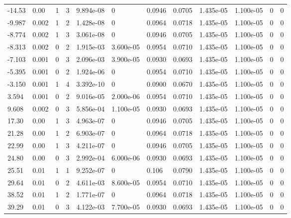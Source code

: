 \documentclass[preview]{standalone}
\begin{document}
{{\begin{tabular}{L{1.2cm}C{1.2cm} C{0.3cm}C{0.5cm} C{1.4cm}C{1.4cm} C{1.4cm}C{1.4cm} C{1.6cm}C{1.6cm} C{1.6cm}C{1.6cm}}
  -14.53  &  0.00  & 1     &  3 &  9.894e-08  & 0  &  0.0946&   0.0705& 1.435e-05 & 1.100e-05   &  0 & 0  \\ 
  -9.987  &  0.002  & 1     &  2 &  1.428e-08  & 0  &  0.0964&   0.0718& 1.435e-05 & 1.100e-05   &  0 & 0  \\ 
  -8.774  &  0.002  & 1     &  3 &  3.061e-08  & 0  &  0.0946&   0.0705& 1.435e-05 & 1.100e-05   &  0 & 0  \\ 
  -8.313  &  0.002  & 0     &  2 &  1.915e-03  & 3.600e-05  &  0.0954&   0.0710& 1.435e-05 & 1.100e-05   &  0 & 0  \\ 
  -7.103  &  0.001  & 0     &  3 &  2.096e-03  & 3.900e-05  &  0.0930&   0.0693& 1.435e-05 & 1.100e-05   &  0 & 0  \\ 
  -5.395  &  0.001  & 0     &  2 &  1.924e-06  & 0  &  0.0954&   0.0710& 1.435e-05 & 1.100e-05   &  0 & 0  \\ 
  -3.150  &  0.001  & 1     &  4 &  3.392e-10  & 0  &  0.0900&   0.0670& 1.435e-05 & 1.100e-05   &  0 & 0  \\ 
  3.594  &  0.001  & 0     &  2 &  9.016e-05  & 2.000e-06  &  0.0954&   0.0710& 1.435e-05 & 1.100e-05   &  0 & 0  \\ 
  9.608  &  0.002  & 0     &  3 &  5.856e-04  & 1.100e-05  &  0.0930&   0.0693& 1.435e-05 & 1.100e-05   &  0 & 0  \\ 
  17.30  &  0.00  & 1     &  3 &  4.963e-07  & 0  &  0.0946&   0.0705& 1.435e-05 & 1.100e-05   &  0 & 0  \\ 
  21.28  &  0.00  & 1     &  2 &  6.903e-07  & 0  &  0.0964&   0.0718& 1.435e-05 & 1.100e-05   &  0 & 0  \\ 
  22.99  &  0.00  & 1     &  3 &  4.211e-07  & 0  &  0.0946&   0.0705& 1.435e-05 & 1.100e-05   &  0 & 0  \\ 
  24.80  &  0.00  & 0     &  3 &  2.992e-04  & 6.000e-06  &  0.0930&   0.0693& 1.435e-05 & 1.100e-05   &  0 & 0  \\ 
  25.51  &  0.01  & 1     &  1 &  9.252e-07  & 0  &  0.106&   0.0790& 1.435e-05 & 1.100e-05   &  0 & 0  \\ 
  29.64  &  0.01  & 0     &  2 &  4.611e-03  & 8.600e-05  &  0.0954&   0.0710& 1.435e-05 & 1.100e-05   &  0 & 0  \\ 
  38.52  &  0.01  & 1     &  2 &  1.771e-07  & 0  &  0.0964&   0.0718& 1.435e-05 & 1.100e-05   &  0 & 0  \\ 
  39.29  &  0.01  & 0     &  3 &  4.122e-03  & 7.700e-05  &  0.0930&   0.0693& 1.435e-05 & 1.100e-05   &  0 & 0  \\ 

\end{tabular}}}
\end{document}
